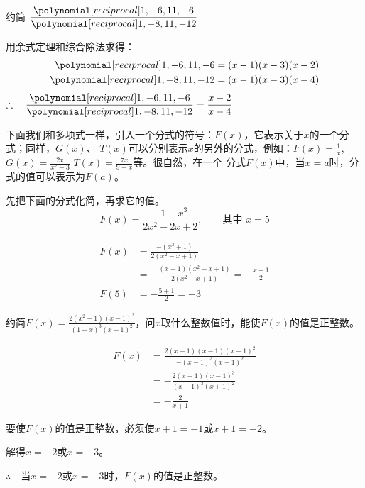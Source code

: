 \begin{example}
    约简 $\frac{\poly{1,-6,11,-6}}{\poly{1,-8,11,-12}}$  
\end{example}

\begin{solution}
用余式定理和综合除法求得：
\[\begin{split}
    \poly{1,-6,11,-6}&=(x-1)(x-3)(x-2)\\
    \poly{1,-8,11,-12}&=(x-1)(x-3)(x-4)
\end{split}\]
$\therefore\quad \frac{\poly{1,-6,11,-6}}{\poly{1,-8,11,-12}}=\frac{x-2}{x-4}$
\end{solution}

下面我们和多项式一样，引入一个分式的符号：$F(x)$，它表示关于$x$的一个分式；同样，$G(x)$、
$T(x)$可以分别表示$x$的另外的分式，例如：$F(x)=\frac{1}{x}$, $G(x)=\frac{2x}{x^2-3}$
$T (x) =\frac{7x}{9-x}$等。很自然，在一个
分式$F(x)$中，当$x=a$时，分式的值可以表示为$F (a)$。

\begin{example}
    先把下面的分式化简，再求它的值。
    \[F(x)=\frac{-1-x^3}{2x^2-2x+2},\qquad \text{其中 } x=5 \]
\end{example}
\begin{solution}
    \[\begin{split}
        F(x)&=\frac{-(x^3+1)}{2(x^2-x+1)}\\
&=-\frac{(x+1)(x^2-x+1)}{2(x^2-x+1)}=-\frac{x+1}{2}\\        
F(5)&=-\frac{5+1}{2}=-3
    \end{split}\]
\end{solution}

\begin{example}
    约简$F(x)=\frac{2(x^2-1)(x-1)^2}{(1-x)^3(x+1)^2}$，问$x$取什么整数值时，能使$F(x)$的值是正整数。
\end{example}

\begin{solution}
    \[\begin{split}
        F(x)&=\frac{2(x+1)(x-1)(x-1)^2}{-(x-1)^3 (x+1)^2}\\
        &=-\frac{2(x+1)(x-1)^3}{(x-1)^3(x+1)^2}\\
        &=-\frac{2}{x+1}
    \end{split}\]

    要使$F(x)$的值是正整数，必须使$x+1=-1$或$x+1=-2$。

    解得$x=-2$或$x=-3$。

    $\therefore\quad $当$x=-2$或$x=-3$时，$F(x)$的值是正整数。
\end{solution}

